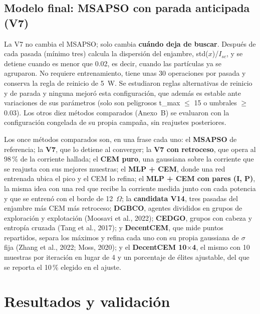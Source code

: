 \documentclass[letterpaper,11pt]{article}
\begin{document}
\subsection{Modelo final: MSAPSO con parada anticipada (V7)}
La V7 no cambia el MSAPSO; solo cambia \textbf{cuándo deja de buscar}. Después de cada pasada (mínimo tres) calcula la dispersión del enjambre, std($x$)/$I_{sc}$, y se detiene cuando es menor que 0.02, es decir, cuando las partículas ya se agruparon. No requiere entrenamiento, tiene unas 30 operaciones por pasada y conserva la regla de reinicio de 5~W. Se estudiaron reglas alternativas de reinicio y de parada y ninguna mejoró esta configuración, que además es estable ante variaciones de sus parámetros (solo son peligrosos t\_max $\leq$ 15 o umbrales $\geq$ 0.03). Los otros diez métodos comparados (Anexo~B) se evaluaron con la configuración congelada de su propia campaña, sin reajustes posteriores.

Los once métodos comparados son, en una frase cada uno: el \textbf{MSAPSO} de referencia; la \textbf{V7}, que lo detiene al converger; la \textbf{V7 con retroceso}, que opera al 98\,\% de la corriente hallada; el \textbf{CEM puro}, una gaussiana sobre la corriente que se reajusta con sus mejores muestras; el \textbf{MLP + CEM}, donde una red entrenada ubica el pico y el CEM lo refina; el \textbf{MLP + CEM con pares (I, P)}, la misma idea con una red que recibe la corriente medida junto con cada potencia y que se entrenó con el borde de 12~$\Omega$; la \textbf{candidata V14}, tres pasadas del enjambre más CEM más retroceso; \textbf{DGBCO}, agentes divididos en grupos de exploración y explotación (Moosavi et al., 2022); \textbf{CEDGO}, grupos con cabeza y entropía cruzada (Tang et al., 2017); y \textbf{DecentCEM}, que mide puntos repartidos, separa los máximos y refina cada uno con su propia gaussiana de $\sigma$ fija (Zhang et al., 2022; Moss, 2020); y el \textbf{DecentCEM 10$\times$4}, el mismo con 10 muestras por iteración en lugar de 4 y un porcentaje de élites ajustable, del que se reporta el 10\,\% elegido en el ajuste.

\section{Resultados y validación}
\end{document}
